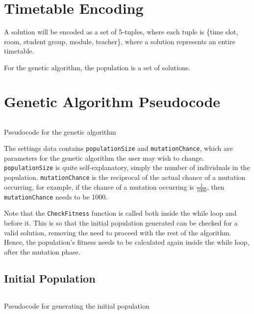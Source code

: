 \section{Timetable Encoding}

A solution will be encoded as a set of 5-tuples, where each tuple is 
\{time slot, room, student group, module, teacher\}, where a solution represents
an entire timetable.

For the genetic algorithm, the population is a set of solutions.

\newpage

\section{Genetic Algorithm Pseudocode}

\begin{listing}[!ht]
	\inputminted[linenos, fontsize=\footnotesize]{text}{code/ga-pseudocode.txt}
	\caption{Pseudocode for the genetic algorithm}
	\label{listing:genetic-algorithm}
\end{listing}

The settings data contains \verb|populationSize| and \verb|mutationChance|, 
which are parameters for the genetic algorithm the user may wish to change.
\verb|populationSize| is quite self-explanatory, simply the number of 
individuals in the population.
\verb|mutationChance| is the reciprocal of the actual chance of a mutation 
occurring, for example, if the chance of a mutation occurring is 
\( \frac{1}{1000} \), then \verb|mutationChance| needs to be 1000.

Note that the \verb|CheckFitness| function is called both inside the while loop
and before it.
This is so that the initial population generated can be checked for a valid 
solution, removing the need to proceed with the rest of the algorithm.
Hence, the population's fitness needs to be calculated again inside the while
loop, after the mutation phase.

\newpage

\subsection{Initial Population}

\begin{listing}[!ht]
	\inputminted[linenos, fontsize=\footnotesize]{text}{code/population.txt}
	\caption{Pseudocode for generating the initial population}
	\label{listing:population}
\end{listing}

